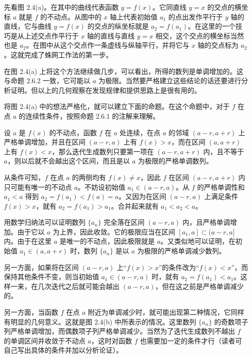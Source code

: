 先看图 2.4(a)。在其中的曲线代表函数 $y=f(x)$。它同直线 $y=x$ 的交点的横坐标 $a$ 就是 $f$ 的不动点。从图中的 $x$ 轴上代表初始值 $a_1$ 的点出发作平行于 $y$ 轴的直线，它与曲线 $y=f(x)$ 的交点的纵坐标就是 $a_2=f(a_1)$。在这里的一个技巧是从上述交点作平行于 $x$ 轴的直线与直线 $y=x$ 相交，这个交点的横坐标当然也是 $a_2$。在图中从这个交点作一条虚线与纵轴平行，并将它与 $x$ 轴的交点标为 $a_2$。这就完成了蛛网工作法的第一步。

在图 2.4(a) 上将这个方法继续做几步，可以看出，所得的数列是单调增加的。这与命题 2.6.2 一致，它可能以 $a$ 为极限。当然要严格建立这些结论的话还要进行分析证明。但以上的几何观察在发现规律和提供思路上是很有用的。

将图 2.4(a) 中的想法严格化，就可以建立下面的命题。在这个命题中，对于 $f$ 在点 $a$ 的连续性条件，按照命题 2.6.1 的注解来理解。

\begin{xproposition}[2.6.3]
设 $a$ 是 $f(x)$ 的不动点，函数 $f$ 在 $a$ 处连续，在点 $a$ 的邻域 $(a-r,a+r)$ 上严格单调增加，并且在区间 $(a-r,a)$ 上有 $f(x)>x$，而在区间 $(a,a+r)$ 上有 $f(x)<x$，那么迭代生成数列只要第一项在 $(a-r,a+r)$ 内，且不等于 $a$，则以后就不会越出这个区间，而且是以 $a$ 为极限的严格单调数列。
\end{xproposition}
\begin{xproof}
从条件可知，$f$ 在点 $a$ 的两侧均有 $f(x)\ne x$，因此 $f$ 在区间 $(a-r,a+r)$ 内只可能有唯一的不动点 $a$。不妨设初始值 $a_1\in(a-r,a)$。从 $f$ 的严格单调性和 $a_1<a$ 得到 $a_2=f(a_1)<f(a)=a$。又因为在区间 $(a-r,a)$ 上满足条件 $f(x)>x$，就有 $a_2=f(a_1)>a_1$。合并起来就有 $a_1<a_2<a$。

用数学归纳法可以证明数列 $\{a_n\}$ 完全落在区间 $(a-r,a)$ 内，且严格单调增加。由于它以 $a$ 为上界，因此收敛。它的极限应当在区间 $[a_1,a]\subset(a-r,a]$ 内。由于在这里 $a$ 是唯一的不动点，因此极限就是 $a$。又类似地可以证明，在初始值 $a_1\in(a,a+r)$ 时，数列 $\{a_n\}$ 是以 $a$ 为极限的严格单调减少数列。
\end{xproof}

另一方面，如果将在区间 $(a-r,a)$ 上“$f(x)>x$”的条件改为“$f(x)<x$”，而保持其他条件不变，则当初始值 $a_1\in(a-r,a)$ 时，就有 $a_2=f(a_1)<a_1$。这样一来，在几次迭代之后就可能会越出 $(a-r,a)$，但在这之前是严格单调减少的。

另一方面，当函数 $f$ 在点 $a$ 附近为单调减少时，就可能出现第二种情况，它同样有明显的几何意义。这就是图 2.4(b) 中所表示的情况。这里数列 $\{a_n\}$ 的奇数项子列严格单调增加，而偶数项子列严格单调减少。当然为了迭代生成数列不越出 $f$ 的单调区间并收敛于不动点 $a$，这时对函数 $f$ 也需要加一定的条件才行（读者可自己写出具体的条件并加以分析论证）。


